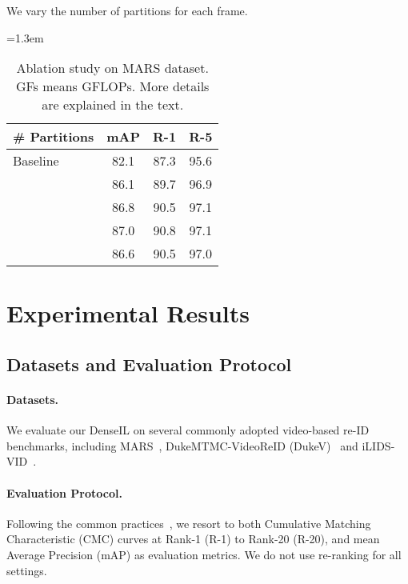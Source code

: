 \documentclass[10pt,twocolumn,letterpaper]{article}
\begin{document}
\begin{table*}[t]
\begin{subtable}[t]{0.32\textwidth}
		\vspace{6pt}
		\footnotesize
		\caption{We vary the number of partitions for each frame.}
		\label{tab:numofpart}
		{\def\arraystretch{1}\tabcolsep=1.3em
		\begin{tabular}[t]{@{}l|ccc@{}}
			\toprule[1.5pt]
			\# Partitions  & mAP & R-1 & R-5  \\
			\midrule
			Baseline                     & 82.1    & 87.3    & 95.6     \\
			\midrule
			             & 86.1    & 89.7    & 96.9     \\
			             & 86.8    & 90.5    & 97.1   \\
			             & 87.0    & 90.8    & 97.1      \\
			             & 86.6    & 90.5    & 97.0   \\
			\bottomrule[1.5pt]
		\end{tabular}
		}		
	\end{subtable}
	\hfill
	\vspace{-1mm}
	\caption{Ablation study on MARS dataset. GFs means GFLOPs. More details are explained in the text.}
	\vspace{-3mm}
    \label{tab:temps}
\end{table*}

\section{Experimental Results}
\label{sec:exps}

\subsection{Datasets and Evaluation Protocol}
\paragraph{Datasets.}
We evaluate our DenseIL on several commonly adopted video-based re-ID benchmarks, including MARS~\cite{zheng2016mars}, DukeMTMC-VideoReID (DukeV)~\cite{ristani2016performance,wu2018exploit} and iLIDS-VID~\cite{wang2014person}.


\paragraph{Evaluation Protocol.}
Following the common practices~\cite{zheng2015scalable,zheng2016mars,li2018diversity,yang2020spatial}, we resort to both Cumulative Matching Characteristic (CMC) curves at Rank-1 (R-1) to Rank-20 (R-20), and mean Average Precision (mAP) as evaluation metrics. We do not use re-ranking for all settings.
\end{document}
